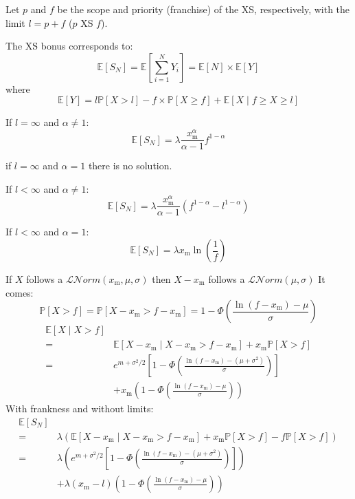 \begin{f}
Let \(p\) and \(f\) be the scope and priority (franchise) of the XS, respectively, with the limit \(l=p+f\) (\(p\) XS \(f\)).

The XS bonus corresponds to:
\[
\mathbb{E}\left[S_N\right]=\mathbb{E}\left[\sum_{i=1}^{N} Y_{i}\right]=\mathbb{E}[N]\times \mathbb{E}[Y]
\]
where
\[
\mathbb{E}[Y]= l \mathbb{P}[X>l] - f \times \mathbb{P}[X\geq f] + \mathbb{E}[X\mid f\geq X\geq l]
\]


If \(l=\infty\) and \(\alpha \neq 1\):
\[
\mathbb{E}[S_N] = \lambda \frac{x_\mathrm{m}^{\alpha}}{\alpha -1}f^{1-\alpha} 
\]

if  \(l=\infty\) and \(\alpha = 1\) there is no solution.

If \(l<\infty\) and \(\alpha \neq 1\):
\[
\mathbb{E}[S_N] = \lambda \frac{x_\mathrm{m}^{\alpha}}{\alpha -1}\left( f^{1-\alpha} -l^{1-\alpha} \right)
\]

If \(l<\infty\) and \(\alpha = 1\):
\[
\mathbb{E}[S_N] = \lambda x_\mathrm{m} \ln \left(  \frac{1}{f}\right)
\]
\end{f}



\begin{f}

If \(X\) follows a \(\mathcal{L}\mathcal{N}orm(x_\mathrm{m}, \mu, \sigma)\) then \(X-x_\mathrm{m}\) follows a \(\mathcal{L}\mathcal{N}orm(\mu, \sigma)\)
It comes:
\[
\mathbb{P}[X>f]=\mathbb{P}[X-x_\mathrm{m}>f-x_\mathrm{m}]=1-\Phi\left(\frac{\ln(f-x_\mathrm{m})-\mu}{\sigma}\right)
\]
\begin{align*}
	\mathbb{E}[X\mid X>f] \\ 
	= & \mathbb{E}\left[ X-x_\mathrm{m}\mid X-x_\mathrm{m}>f-x_\mathrm{m} \right]+x_\mathrm{m} \mathbb{P}[X>f]\\
	= & e ^{m+\sigma^2/2} \left[1-\Phi\left(\frac{\ln(f-x_\mathrm{m})-(\mu+\sigma^2)}{\sigma}\right) \right]\\
	& +x_\mathrm{m} \left( 1-\Phi\left(\frac{\ln(f-x_\mathrm{m})-\mu}{\sigma}\right) \right)
\end{align*}
With frankness and without limits:
\begin{align*}
	\mathbb{E}[S_N] \\ 
	= & \lambda \left(\mathbb{E}\left[ X-x_\mathrm{m}\mid X-x_\mathrm{m}>f-x_\mathrm{m} \right]+x_\mathrm{m} \mathbb{P}[X>f]-f\mathbb{P}[X>f]\right)\\
	= & \lambda \left(  e ^{m+\sigma^2/2} \left[1-\Phi\left(\frac{\ln(f-x_\mathrm{m})-(\mu+\sigma^2)}{\sigma}\right) \right]\right)\\
	& +\lambda (x_\mathrm{m}-l) \left( 1-\Phi\left(\frac{\ln(f-x_\mathrm{m})-\mu}{\sigma}\right) \right)
\end{align*}

\end{f}